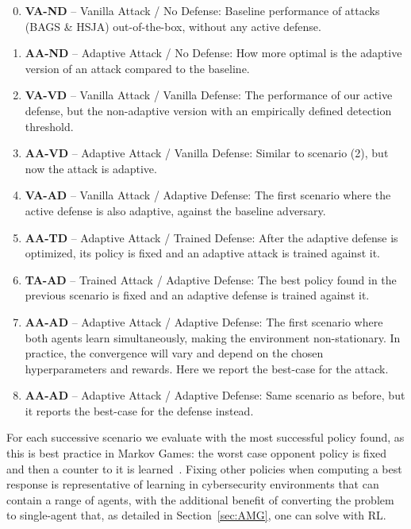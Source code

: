 \begin{enumerate}[leftmargin=*]
\setcounter{enumi}{-1} 
    \setlength\itemsep{0.1em}
    \item \textbf{VA-ND} -- Vanilla Attack / No Defense: Baseline performance of attacks (BAGS \& HSJA) out-of-the-box, without any active defense.
    \item \textbf{AA-ND} -- Adaptive Attack / No Defense: How more optimal is the adaptive version of an attack compared to the baseline.
    \item \textbf{VA-VD} -- Vanilla Attack / Vanilla Defense: The performance of our active defense, but the non-adaptive version with an empirically defined detection threshold.
    \item \textbf{AA-VD} -- Adaptive Attack / Vanilla Defense: Similar to scenario (2), but now the attack is adaptive.
    \item \textbf{VA-AD} -- Vanilla Attack / Adaptive Defense: The first scenario where the active defense is also adaptive, against the baseline adversary.
    \item \textbf{AA-TD} -- Adaptive Attack / Trained Defense: After the adaptive defense is optimized, its policy is fixed and an adaptive attack is trained against it.
    \item \textbf{TA-AD} -- Trained Attack / Adaptive Defense: The best policy found in the previous scenario is fixed and an adaptive defense is trained against it.
    \item \textbf{AA-AD} -- Adaptive Attack / Adaptive Defense: The first scenario where both agents learn simultaneously, making the environment non-stationary. In practice, the convergence will vary and depend on the chosen hyperparameters and rewards. Here we report the best-case for the attack.
    \item \textbf{AA-AD} -- Adaptive Attack / Adaptive Defense: Same scenario as before, but it reports the best-case for the defense instead.
\end{enumerate}


For each successive scenario we evaluate with the most successful policy found, as this is best practice in Markov Games: the worst case opponent policy is fixed and then a counter to it is learned~\cite{littman1994markov, timbers2022approximate}.
Fixing other policies when computing a best response is representative of learning in cybersecurity environments that can contain a range of agents, with the additional benefit of converting the problem to single-agent that, as detailed in Section~\ref{sec:AMG}, one can solve with \gls{RL}.

